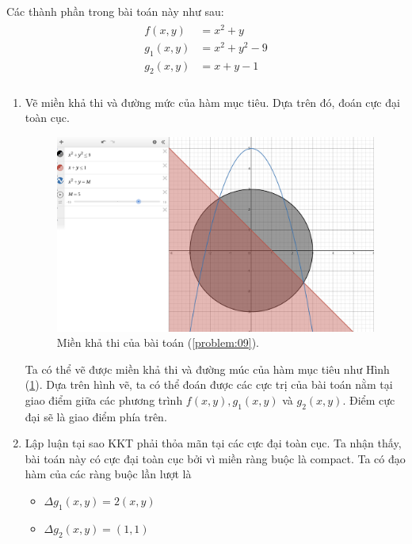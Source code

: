 \begin{solution}

    Các thành phần trong bài toán này như sau:
    \begin{align}
        \begin{aligned}
            f(x,y) &= x^2 + y\\
            g_1(x, y) &= x^2 + y^2 - 9 \\
            g_2(x, y) &= x + y  - 1 \\
        \end{aligned}
    \end{align}
    \begin{enumerate}[label=(\alph*)]
        \item Vẽ miền khả thi và đường mức của hàm mục tiêu. Dựa trên đó, đoán cực đại toàn cục.
        \begin{figure}[h!]
            \includegraphics[width=0.85\linewidth]{figures/BT09.png}
            \caption{Miền khả thi của bài toán (\ref{problem:09}).}
            \label{fig:feasible_region_problem_09}
        \end{figure}
        Ta có thể vẽ được miền khả thi và đường múc của hàm mục tiêu như Hình (\ref{fig:feasible_region_problem_09}). Dựa trên hình vẽ, ta có thể đoán được các cực trị của bài toán nằm tại giao điểm giữa các phương trình $f(x,y), g_1(x, y)$ và $g_2(x, y)$. Điểm cực đại sẽ là giao điểm phía trên.
        \item Lập luận tại sao KKT phải thỏa mãn tại các cực đại toàn cục. Ta nhận thấy, bài toán này có cực đại toàn cục bởi vì miền ràng buộc là compact. Ta có đạo hàm của các ràng buộc lần lượt là 
        \begin{itemize}
            \item $\Delta g_1(x, y) = 2(x,y)$ 
            \item $\Delta g_2(x,y) = (1,1)$
        \end{itemize}

\end{enumerate}
\end{solution}
